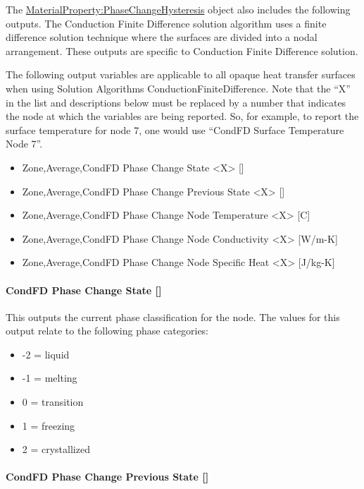 The \hyperref[materialpropertyphasechangehysteresis]{MaterialProperty:PhaseChangeHysteresis} object also includes the following outputs. The Conduction Finite Difference solution algorithm uses a finite difference solution technique where the surfaces are divided into a nodal arrangement. These outputs are specific to Conduction Finite Difference solution.

The following output variables are applicable to all opaque heat transfer surfaces when using Solution Algorithms ConductionFiniteDifference. Note that the ``X'' in the list and descriptions below must be replaced by a number that indicates the node at which the variables are being reported.  So, for example, to report the surface temperature for node 7, one would use ``CondFD Surface Temperature Node 7''.

\begin{itemize}
\item
  Zone,Average,CondFD Phase Change State \textless{}X\textgreater{} {[]}
\item
  Zone,Average,CondFD Phase Change Previous State \textless{}X\textgreater{} {[]}
\item
  Zone,Average,CondFD Phase Change Node Temperature \textless{}X\textgreater{} {[}C{]}
\item
  Zone,Average,CondFD Phase Change Node Conductivity \textless{}X\textgreater{} {[}W/m-K{]}
\item
  Zone,Average,CondFD Phase Change Node Specific Heat \textless{}X\textgreater{} {[}J/kg-K{]}
\end{itemize}

\paragraph{CondFD Phase Change State {[]}}\label{condfd-phase-change-state}

This outputs the current phase classification for the node.  The values for this output relate to the following phase categories:

\begin{itemize}
\item
-2 = liquid
\item
-1 = melting
\item
0 = transition
\item
1 = freezing
\item
2 = crystallized
\end{itemize}

\paragraph{CondFD Phase Change Previous State {[]}}\label{condfd-phase-change-previous-state}

